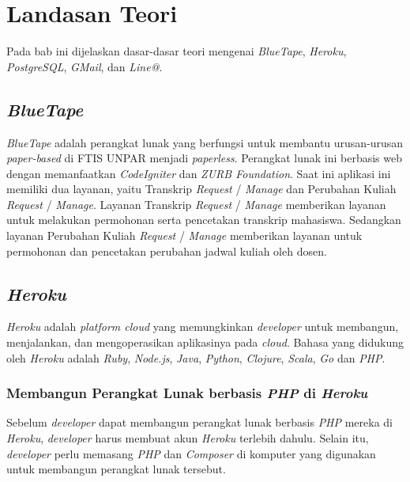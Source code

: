 \chapter{Landasan Teori}
\label{chap:teori}
Pada bab ini dijelaskan dasar-dasar teori mengenai \textit{BlueTape}, \textit{Heroku}, \textit{PostgreSQL}, \textit{GMail}, dan \textit{Line@}.

\section{\textit{BlueTape}}
\label{sec:BlueTape}
\textit{BlueTape} adalah perangkat lunak yang berfungsi untuk membantu urusan-urusan \textit{paper-based} di FTIS UNPAR menjadi \textit{paperless}. Perangkat lunak ini berbasis web dengan memanfaatkan \textit{CodeIgniter} dan \textit{ZURB Foundation}. Saat ini aplikasi ini memiliki dua layanan, yaitu Transkrip \textit{Request} / \textit{Manage} dan Perubahan Kuliah \textit{Request} / \textit{Manage}. Layanan Transkrip \textit{Request} / \textit{Manage} memberikan layanan untuk melakukan permohonan serta pencetakan transkrip mahasiswa. Sedangkan layanan Perubahan Kuliah \textit{Request} / \textit{Manage} memberikan layanan untuk permohonan dan pencetakan perubahan jadwal kuliah oleh dosen. \footnotemark
{}

\section{\textit{Heroku}}
\label{sec:Heroku}
\textit{Heroku} adalah \textit{platform cloud} yang memungkinkan \textit{developer} untuk membangun, menjalankan, dan mengoperasikan aplikasinya pada \textit{cloud}. Bahasa yang didukung oleh \textit{Heroku} adalah \textit{Ruby}, \textit{Node.js}, \textit{Java}, \textit{Python}, \textit{Clojure}, \textit{Scala}, \textit{Go} dan \textit{PHP}. \footnotemark
{}

\subsection{Membangun Perangkat Lunak berbasis \textit{PHP} di \textit{Heroku}}
Sebelum \textit{developer} dapat membangun perangkat lunak berbasis \textit{PHP} mereka di \textit{Heroku}, \textit{developer} harus membuat akun \textit{Heroku} terlebih dahulu. Selain itu, \textit{developer} perlu memasang \textit{PHP} dan \textit{Composer} di komputer yang digunakan untuk membangun perangkat lunak tersebut.\footnotemark
{}

